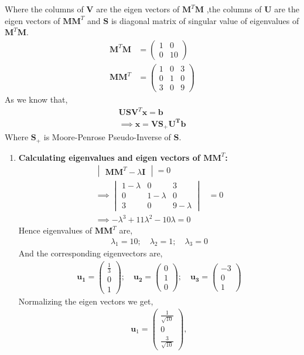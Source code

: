 \documentclass[journal,12pt,twocolumn]{IEEEtran}
\let\vec\mathbf
\numberwithin{equation}{subsection}
\newcommand{\myvec}[1]{\ensuremath{\begin{pmatrix}#1\end{pmatrix}}}
\newcommand{\mydet}[1]{\ensuremath{\begin{vmatrix}#1\end{vmatrix}}}
\begin{document}
\begin{enumerate}
Where the columns of $\vec{V}$ are the eigen vectors of $\vec{M}^T\vec{M}$ ,the columns of $\vec{U}$ are the eigen vectors of $\vec{M}\vec{M}^T$ and $\vec{S}$ is diagonal matrix of singular value of eigenvalues of $\vec{M}^T\vec{M}$.
\begin{align}
    \vec{M}^T\vec{M} &= \myvec{1 & 0\\0 & 10} \\
    \vec{M}\vec{M}^T &= \myvec{1 & 0& 3\\0 & 1 & 0\\ 3 & 0 & 9} 
\end{align}
As we know that,
\begin{align}
    \vec{U} \vec{S} \vec{V}^T \vec{x} = \vec{b} \nonumber \\
    \implies \vec{x} = \vec{V} \vec{S_+} \vec{U^T} \vec{b} \label{eq:eq_9}
\end{align}
Where $\vec{S_+}$ is Moore-Penrose Pseudo-Inverse of $\vec{S}$.
\begin{enumerate}
\item \textbf{Calculating eigenvalues and eigen vectors of $\vec{M}\vec{M}^T$: }
\begin{align}
    \mydet{\vec{M} \vec{M}^T - \lambda \vec{I}} = 0 \nonumber \\
    \implies \mydet{1-\lambda & 0& 3\\0 & 1-\lambda & 0\\ 3 & 0 & 9-\lambda} &= 0 \nonumber \\
    \implies -\lambda^3 +11\lambda^2 -10\lambda =0 \nonumber
\end{align}
Hence eigenvalues of $\vec{M}\vec{M}^T$ are,
\begin{align} \label{eq:eq_10}
    \lambda_1 = 10; \quad \lambda_2 = 1; \quad \lambda_3 =0
\end{align}
And the corresponding eigenvectors are,
\begin{align}
    \vec{u_1} = \myvec{\frac{1}{3} \\ 0 \\ 1}; \quad \vec{u_2} = \myvec{0 \\ 1 \\ 0}; \quad
    \vec{u_3} = \myvec{-3\\ 0 \\ 1} \label{eq:eq_11} 
\end{align}
Normalizing the eigen vectors we get,
\begin{align}
\vec{u}_1=\myvec{\frac{1}{\sqrt{10}}\\0\\\frac{3}{\sqrt{10}}},

\end{align}
\end{enumerate}
\end{enumerate}
\end{document}
